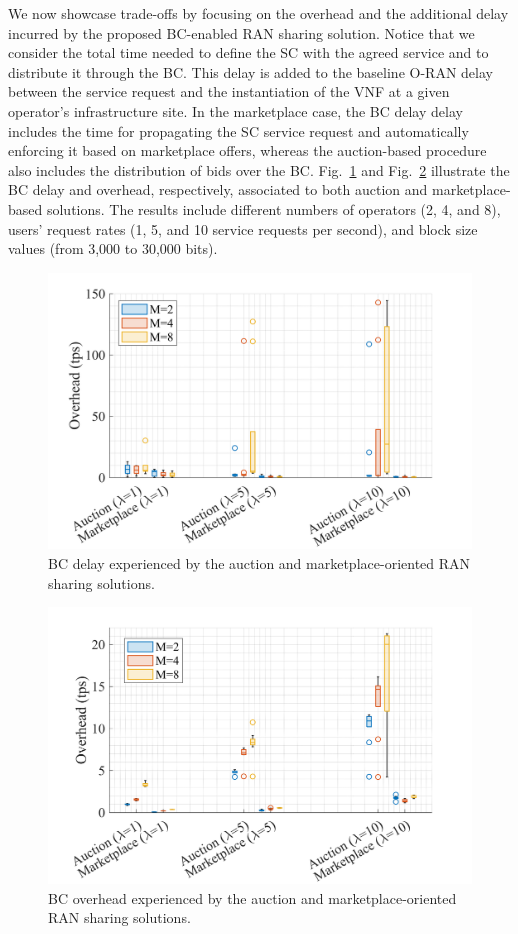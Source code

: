 \documentclass[journal]{IEEEtran}
\begin{document}
We now showcase trade-offs by focusing on the overhead and the additional delay incurred by the proposed BC-enabled RAN sharing solution. Notice that we consider the total time needed to define the SC with the agreed service and to distribute it through the BC. This delay is added to the baseline O-RAN delay between the service request and the instantiation of the VNF at a given operator's infrastructure site. In the marketplace case, the BC delay delay includes the time for propagating the SC service request and automatically enforcing it based on marketplace offers, whereas the auction-based procedure also includes the distribution of bids over the BC. Fig.~\ref{fig:delay} and Fig.~\ref{fig:overhead} illustrate the BC delay and overhead, respectively, associated to both auction and marketplace-based solutions. The results include different numbers of operators (2, 4, and 8), users' request rates (1, 5, and 10 service requests per second), and block size values (from 3,000 to 30,000 bits).

\begin{figure}[ht!]
\centering
\includegraphics[width=.85\linewidth]{delay_new.png}
\caption{BC delay experienced by the auction and marketplace-oriented RAN sharing solutions.}%
\label{fig:delay}
\end{figure}

\begin{figure}[ht!]
\centering
\includegraphics[width=.85\linewidth]{overhead_new.png}
\caption{BC overhead experienced by the auction and marketplace-oriented RAN sharing solutions.}
\label{fig:overhead}
\end{figure}
\end{document}
